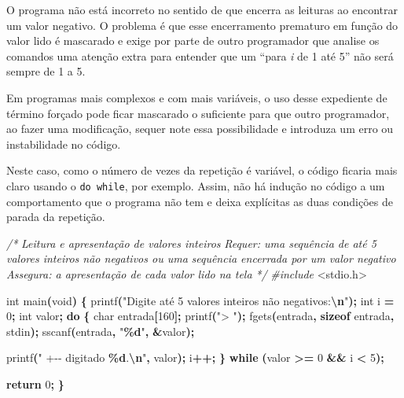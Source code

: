 \documentclass[
  11pt,
  a4paper,
]{scrbook}
\newenvironment{Shaded}{\begin{snugshade}}{\end{snugshade}}
\newcommand{\CommentTok}[1]{\textcolor[rgb]{0.56,0.35,0.01}{\textit{#1}}}
\newcommand{\ControlFlowTok}[1]{\textcolor[rgb]{0.13,0.29,0.53}{\textbf{#1}}}
\newcommand{\DataTypeTok}[1]{\textcolor[rgb]{0.13,0.29,0.53}{#1}}
\newcommand{\DecValTok}[1]{\textcolor[rgb]{0.00,0.00,0.81}{#1}}
\newcommand{\ImportTok}[1]{#1}
\newcommand{\KeywordTok}[1]{\textcolor[rgb]{0.13,0.29,0.53}{\textbf{#1}}}
\newcommand{\NormalTok}[1]{#1}
\newcommand{\OperatorTok}[1]{\textcolor[rgb]{0.81,0.36,0.00}{\textbf{#1}}}
\newcommand{\PreprocessorTok}[1]{\textcolor[rgb]{0.56,0.35,0.01}{\textit{#1}}}
\newcommand{\SpecialCharTok}[1]{\textcolor[rgb]{0.81,0.36,0.00}{\textbf{#1}}}
\newcommand{\StringTok}[1]{\textcolor[rgb]{0.31,0.60,0.02}{#1}}
\begin{document}
O programa não está incorreto no sentido de que encerra as leituras ao
encontrar um valor negativo. O problema é que esse encerramento
prematuro em função do valor lido é mascarado e exige por parte de outro
programador que analise os comandos uma atenção extra para entender que
um ``para \emph{i} de 1 até 5'' não será sempre de 1 a 5.

Em programas mais complexos e com mais variáveis, o uso desse expediente
de término forçado pode ficar mascarado o suficiente para que outro
programador, ao fazer uma modificação, sequer note essa possibilidade e
introduza um erro ou instabilidade no código.

Neste caso, como o número de vezes da repetição é variável, o código
ficaria mais claro usando o \texttt{do\ while}, por exemplo. Assim, não
há indução no código a um comportamento que o programa não tem e deixa
explícitas as duas condições de parada da repetição.

\begin{Shaded}
\begin{Highlighting}[]
\CommentTok{/*}
\CommentTok{Leitura e apresentação de valores inteiros}
\CommentTok{Requer: uma sequência de até 5 valores inteiros não negativos ou uma}
\CommentTok{    sequência encerrada por um valor negativo}
\CommentTok{Assegura: a apresentação de cada valor lido na tela}
\CommentTok{*/}
\PreprocessorTok{\#include }\ImportTok{\textless{}stdio.h\textgreater{}}

\DataTypeTok{int}\NormalTok{ main}\OperatorTok{(}\DataTypeTok{void}\OperatorTok{)} \OperatorTok{\{}
\NormalTok{    printf}\OperatorTok{(}\StringTok{"Digite até 5 valores inteiros não negativos:}\SpecialCharTok{\textbackslash{}n}\StringTok{"}\OperatorTok{);}
    \DataTypeTok{int}\NormalTok{ i }\OperatorTok{=} \DecValTok{0}\OperatorTok{;}
    \DataTypeTok{int}\NormalTok{ valor}\OperatorTok{;}
    \ControlFlowTok{do} \OperatorTok{\{}
        \DataTypeTok{char}\NormalTok{ entrada}\OperatorTok{[}\DecValTok{160}\OperatorTok{];}
\NormalTok{        printf}\OperatorTok{(}\StringTok{"\textgreater{} "}\OperatorTok{);}
\NormalTok{        fgets}\OperatorTok{(}\NormalTok{entrada}\OperatorTok{,} \KeywordTok{sizeof}\NormalTok{ entrada}\OperatorTok{,}\NormalTok{ stdin}\OperatorTok{);}
\NormalTok{        sscanf}\OperatorTok{(}\NormalTok{entrada}\OperatorTok{,} \StringTok{"}\SpecialCharTok{\%d}\StringTok{"}\OperatorTok{,} \OperatorTok{\&}\NormalTok{valor}\OperatorTok{);}

\NormalTok{        printf}\OperatorTok{(}\StringTok{"  +{-}{-} digitado }\SpecialCharTok{\%d}\StringTok{.}\SpecialCharTok{\textbackslash{}n}\StringTok{"}\OperatorTok{,}\NormalTok{ valor}\OperatorTok{);}
\NormalTok{        i}\OperatorTok{++;}
    \OperatorTok{\}} \ControlFlowTok{while} \OperatorTok{(}\NormalTok{valor }\OperatorTok{\textgreater{}=} \DecValTok{0} \OperatorTok{\&\&}\NormalTok{ i }\OperatorTok{\textless{}} \DecValTok{5}\OperatorTok{);}

    \ControlFlowTok{return} \DecValTok{0}\OperatorTok{;}
\OperatorTok{\}}
\end{Highlighting}
\end{Shaded}
\end{document}
